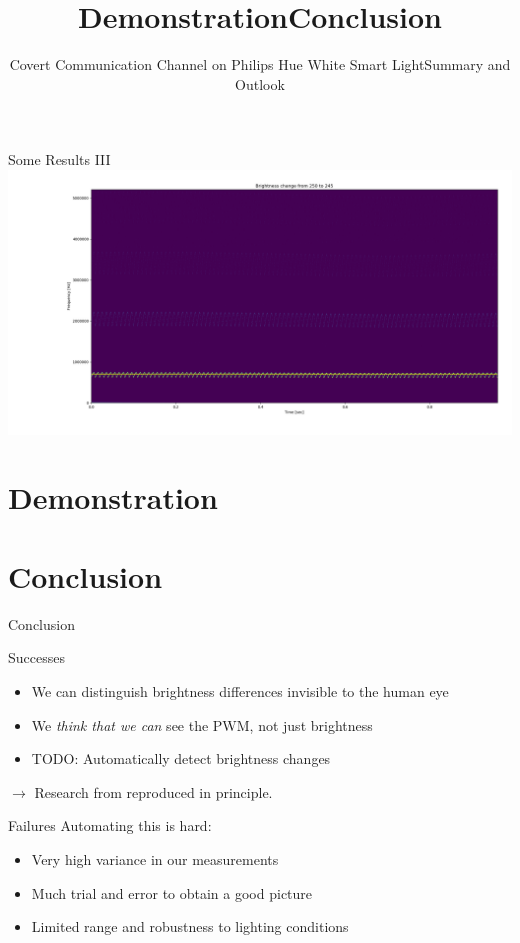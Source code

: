 \documentclass[11pt,t,usepdftitle=false,aspectratio=169]{beamer}
\begin{document}
\begin{frame}{Some Results III}
	\includegraphics[width=\textwidth]{../experiment/250-245.png}
\end{frame}


\section{Demonstration} %
\label{sec:demonstration}
\title{Demonstration}
\subtitle{Covert Communication Channel on Philips Hue White Smart Light}


\section{Conclusion} %
\label{sec:conclusion}
\title{Conclusion}
\subtitle{Summary and Outlook}

\begin{frame}{Conclusion} %
	\begin{block}{Successes}
		\begin{itemize}
			\item We can distinguish brightness differences invisible to the human eye
			\item We \emph{think that we can} see the PWM, not just brightness
			\item TODO: Automatically detect brightness changes
		\end{itemize}
		$\rightarrow$ Research from \cite{Ronen:2016:EFAIDCSL} reproduced in principle.
	\end{block}

	\pause
	\begin{alertblock}{Failures}
		Automating this is hard:
		\begin{itemize}
			\item Very high variance in our measurements
			\item Much trial and error to obtain a good picture
			\item Limited range and robustness to lighting conditions
		\end{itemize}
	\end{alertblock}
\end{frame}
\end{document}
